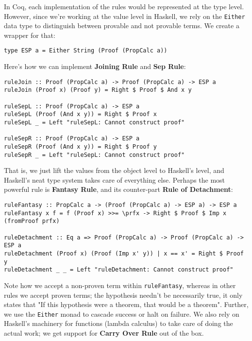 \documentclass{article}
\begin{document}
In Coq, each implementation of the rules would be represented at the type level. However, since we're working at the value level in Haskell, we rely on the \texttt{Either} data type to distinguish between provable and not provable terms. We create a wrapper for that:

\begin{lstlisting}
type ESP a = Either String (Proof (PropCalc a))
\end{lstlisting}

Here's how we can implement \textbf{Joining Rule} and \textbf{Sep Rule}:

\begin{lstlisting}
ruleJoin :: Proof (PropCalc a) -> Proof (PropCalc a) -> ESP a
ruleJoin (Proof x) (Proof y) = Right $ Proof $ And x y

ruleSepL :: Proof (PropCalc a) -> ESP a
ruleSepL (Proof (And x y)) = Right $ Proof x
ruleSepL _ = Left "ruleSepL: Cannot construct proof"

ruleSepR :: Proof (PropCalc a) -> ESP a
ruleSepR (Proof (And x y)) = Right $ Proof y
ruleSepR _ = Left "ruleSepL: Cannot construct proof"
\end{lstlisting}

That is, we just lift the values from the object level to Haskell's level, and Haskell's neat type system takes care of everything else. Perhaps the most powerful rule is \textbf{Fantasy Rule}, and its counter-part \textbf{Rule of Detachment}:

\begin{lstlisting}
ruleFantasy :: PropCalc a -> (Proof (PropCalc a) -> ESP a) -> ESP a
ruleFantasy x f = f (Proof x) >>= \prfx -> Right $ Proof $ Imp x (fromProof prfx)

ruleDetachment :: Eq a => Proof (PropCalc a) -> Proof (PropCalc a) -> ESP a
ruleDetachment (Proof x) (Proof (Imp x' y)) | x == x' = Right $ Proof y
ruleDetachment _ _ = Left "ruleDetachment: Cannot construct proof"
\end{lstlisting}

Note how we accept a non-proven term within \texttt{ruleFantasy}, whereas in other rules we accept proven terms; the hypothesis needn't be necessarily true, it only states that "If this hypothesis were a theorem, that would be a theorem". Further, we use the \texttt{Either} monad to cascade success or halt on failure. We also rely on Haskell's machinery for functions (lambda calculus) to take care of doing the actual work; we get support for \textbf{Carry Over Rule} out of the box.
\end{document}
